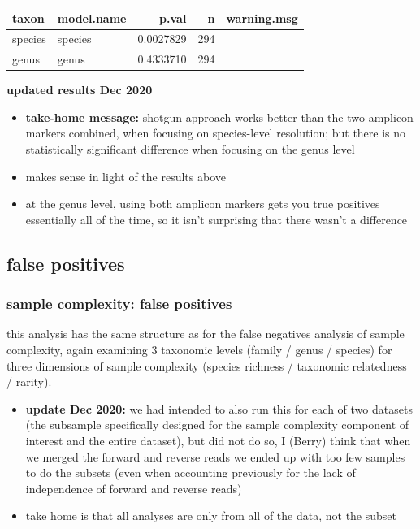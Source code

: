 \documentclass[
]{article}
\providecommand{\tightlist}{%
  \setlength{\itemsep}{0pt}\setlength{\parskip}{0pt}}
\begin{document}
\begin{table}[H]
\centering
\begin{tabular}{l|l|r|r|l}
\hline
taxon & model.name & p.val & n & warning.msg\\
\hline
species & species & 0.0027829 & 294 & \\
\hline
genus & genus & 0.4333710 & 294 & \\
\hline
\end{tabular}
\end{table}

\textbf{updated results Dec 2020}

\begin{itemize}
\tightlist
\item
  \textbf{take-home message:} shotgun approach works better than the two
  amplicon markers combined, when focusing on species-level resolution;
  but there is no statistically significant difference when focusing on
  the genus level
\item
  makes sense in light of the results above
\item
  at the genus level, using both amplicon markers gets you true
  positives essentially all of the time, so it isn't surprising that
  there wasn't a difference
\end{itemize}

\hypertarget{false-positives}{%
\subsection{false positives}\label{false-positives}}

\hypertarget{sample-complexity-false-positives}{%
\subsubsection{sample complexity: false
positives}\label{sample-complexity-false-positives}}

this analysis has the same structure as for the false negatives analysis
of sample complexity, again examining 3 taxonomic levels (family / genus
/ species) for three dimensions of sample complexity (species richness /
taxonomic relatedness / rarity).

\begin{itemize}
\tightlist
\item
  \textbf{update Dec 2020:} we had intended to also run this for each of
  two datasets (the subsample specifically designed for the sample
  complexity component of interest and the entire dataset), but did not
  do so, I (Berry) think that when we merged the forward and reverse
  reads we ended up with too few samples to do the subsets (even when
  accounting previously for the lack of independence of forward and
  reverse reads)
\item
  take home is that all analyses are only from all of the data, not the
  subset
\end{itemize}
\end{document}
